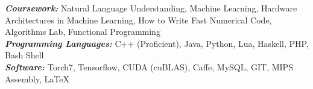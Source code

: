 \documentclass[9pt]{article}
\newenvironment{changemargin}[2]{%
  \begin{list}{}{%
    \setlength{\topsep}{0pt}%
    \setlength{\leftmargin}{#1}%
    \setlength{\rightmargin}{#2}%
    \setlength{\listparindent}{\parindent}%
    \setlength{\itemindent}{\parindent}%
    \setlength{\parsep}{\parskip}%
  }%
  \item[]}{\end{list}
}
\newenvironment{body} {
	\vspace*{-16pt}
	\begin{changemargin}{-0.6in}{-0.65in}
  }	
	{\end{changemargin}
}
\begin{document}
\vspace{3 mm}
\begin{body}
	\vspace{14pt}
	\begin{changemargin}{0.15in}{0.15in}
	\emph{\textbf{Coursework:}} Natural Language Understanding, Machine Learning, Hardware Architectures in Machine Learning, How to Write Fast Numerical Code,	 Algorithms Lab, Functional Programming \\
	\emph{\textbf{Programming Languages: }}{} C++ (Proficient), Java, Python, Lua, Haskell, PHP, Bash Shell\\
	\emph{\textbf{Software: }}{} Torch7, Tensorflow, CUDA (cuBLAS), Caffe, MySQL, GIT, MIPS Assembly, \LaTeX \\
	\end{changemargin}
\end{body}
\end{document}
